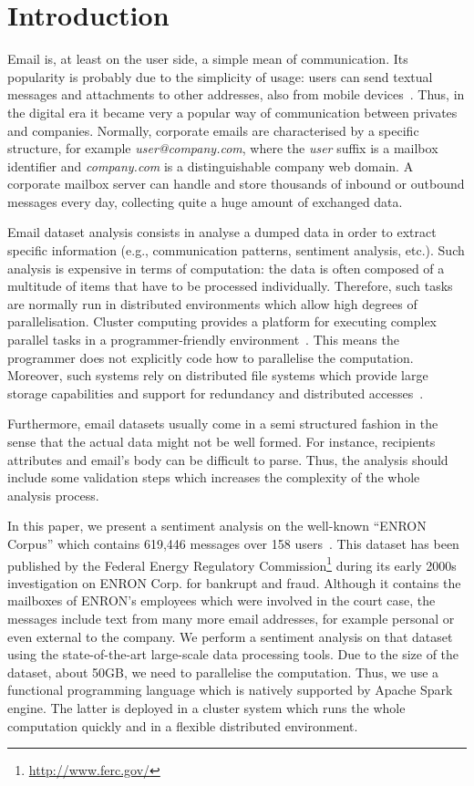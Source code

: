 \documentclass{vldb}
\begin{document}
\section{Introduction}
Email is, at least on the user side, a simple mean of communication.
Its popularity is probably due to the simplicity of usage: users can send textual messages and attachments to other addresses, also from mobile devices~\cite{chen2002enterprise}.   
Thus, in the digital era it became very a popular way of communication between privates and companies.
Normally, corporate emails are characterised by a specific structure, for example \textit{user@company.com}, where the \textit{user} suffix is a mailbox identifier and \textit{company.com} is a distinguishable company web domain.
A corporate mailbox server can handle and store thousands of inbound or outbound messages every day, collecting quite a huge amount of exchanged data.

Email dataset analysis consists in analyse a dumped data in order to extract specific information (e.g., communication patterns, sentiment analysis, etc.).
Such analysis is expensive in terms of computation: the data is often composed of a multitude of items that have to be processed individually.
Therefore, such tasks are normally run in distributed environments which allow high degrees of parallelisation.
Cluster computing provides a platform for executing complex parallel tasks in a programmer-friendly environment~\cite{buyya1999high, zaharia2010spark, shvachko2010hadoop}.
This means the programmer does not explicitly code how to parallelise the computation.
Moreover, such systems rely on distributed file systems which provide large storage capabilities and support for redundancy and distributed accesses~\cite{weil2006ceph}.

Furthermore, email datasets usually come in a semi structured fashion in the sense that the actual data might not be well formed. 
For instance, recipients attributes and email's body can be difficult to parse.
Thus, the analysis should include some validation steps which increases the complexity of the whole analysis process.

In this paper, we present a sentiment analysis on the well-known ``ENRON Corpus'' which contains 619,446 messages over 158 users~\cite{shetty2004enron}.
This dataset has been published by the Federal Energy Regulatory Commission\footnote{\url{http://www.ferc.gov/}} during its early 2000s investigation on ENRON Corp. for bankrupt and fraud.
Although it contains the mailboxes of ENRON's employees which were involved in the court case, the messages include text from many more email addresses, for example personal or even external to the company.
We perform a sentiment analysis on that dataset using the state-of-the-art large-scale data processing tools.
Due to the size of the dataset, about 50GB, we need to parallelise the computation.
Thus, we use a functional programming language which is natively supported by Apache Spark engine.
The latter is deployed in a cluster system which runs the whole computation quickly and in a flexible distributed environment.
\end{document}
